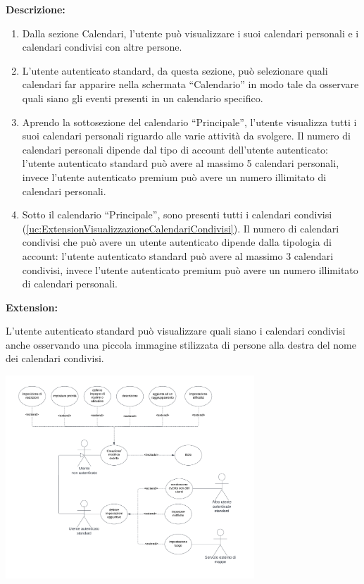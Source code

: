 \begin{listaPersonale}[UC]{}
    \textbf{Descrizione:}
    \begin{enumerate}
        \item Dalla sezione Calendari, l'utente può visualizzare i suoi calendari personali e i calendari condivisi con altre persone.
        \item L'utente autenticato standard, da questa sezione, può selezionare quali calendari far apparire nella schermata “Calendario” in modo tale da osservare quali siano gli eventi presenti in un calendario specifico.
        \item Aprendo la sottosezione del calendario “Principale”, l'utente visualizza tutti i suoi calendari personali riguardo alle varie attività da svolgere. Il numero di calendari personali dipende dal tipo di account dell'utente autenticato: l'utente autenticato standard può avere al massimo 5 calendari personali, invece l'utente autenticato premium può avere un numero illimitato di calendari personali.
        \item Sotto il calendario “Principale”, sono presenti tutti i calendari condivisi (\ref{uc:ExtensionVisualizzazioneCalendariCondivisi}). Il numero di calendari condivisi che può avere un utente autenticato dipende dalla tipologia di account: l'utente autenticato standard può avere al massimo 3 calendari condivisi, invece l'utente autenticato premium può avere un numero illimitato di calendari personali.
    \end{enumerate}


    \textbf{Extension:}
    \begin{enumerate}[label=\textbf{[extension \arabic{enumii}]}, ref= \textbf{[extension \arabic{enumii}]}]
         L'utente autenticato standard può visualizzare quali siano i calendari condivisi anche osservando una piccola immagine stilizzata di persone alla destra del nome dei calendari condivisi.
    \end{enumerate}






    \newpage

    \begin{center}
        \includegraphics[width=0.7\textwidth]{img/Diagrammi/UseCases/CreazioneModificaEvento.png}
    \end{center}



\end{listaPersonale}
